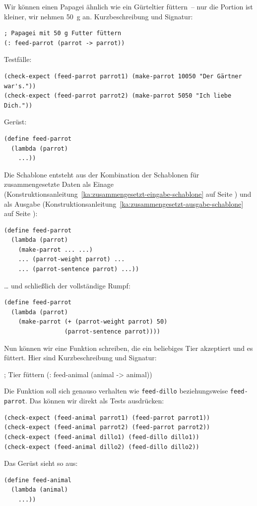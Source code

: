 Wir können einen Papagei ähnlich wie ein Gürteltier füttern~-- nur die
Portion ist kleiner, wir nehmen 50~g an.  Kurzbeschreibung und Signatur:
%
\begin{lstlisting}
; Papagei mit 50 g Futter füttern
(: feed-parrot (parrot -> parrot))
\end{lstlisting}
%
Testfälle:
%
\begin{lstlisting}
(check-expect (feed-parrot parrot1) (make-parrot 10050 "Der Gärtner war's."))
(check-expect (feed-parrot parrot2) (make-parrot 5050 "Ich liebe Dich."))
\end{lstlisting}
%
Gerüst:
%
\begin{lstlisting}
(define feed-parrot
  (lambda (parrot)
    ...))
\end{lstlisting}
%
Die Schablone entsteht aus der Kombination der Schablonen für
zusammengesetzte Daten
als Einage (Konstruktionsanleitung~\ref{ka:zusammengesetzt-eingabe-schablone} auf
Seite \pageref{ka:zusammengesetzt-eingabe-schablone}) und als Ausgabe
(Konstruktionsanleitung~\ref{ka:zusammengesetzt-ausgabe-schablone} auf
Seite \pageref{ka:zusammengesetzt-ausgabe-schablone}):
%
\begin{lstlisting}
(define feed-parrot
  (lambda (parrot)
    (make-parrot ... ...)
    ... (parrot-weight parrot) ...
    ... (parrot-sentence parrot) ...))
\end{lstlisting}
%
\ldots{} und schließlich der vollständige Rumpf:
%
\begin{lstlisting}
(define feed-parrot
  (lambda (parrot)
    (make-parrot (+ (parrot-weight parrot) 50)
                 (parrot-sentence parrot))))
\end{lstlisting}
%
Nun können wir eine Funktion schreiben, die ein beliebiges Tier
akzeptiert und es füttert.  Hier sind Kurzbeschreibung und Signatur:
%
\begin{aufgabe}
; Tier füttern
(: feed-animal (animal -> animal))
\end{aufgabe}
%
Die Funktion soll sich genauso verhalten wie \lstinline{feed-dillo}
beziehungsweise \lstinline{feed-parrot}.  Das können wir direkt als
Tests ausdrücken:
%
\begin{lstlisting}
(check-expect (feed-animal parrot1) (feed-parrot parrot1))
(check-expect (feed-animal parrot2) (feed-parrot parrot2))
(check-expect (feed-animal dillo1) (feed-dillo dillo1))
(check-expect (feed-animal dillo2) (feed-dillo dillo2))
\end{lstlisting}
%
Das Gerüst sieht so aus:
%
\begin{lstlisting}
(define feed-animal
  (lambda (animal)
    ...))
\end{lstlisting}
